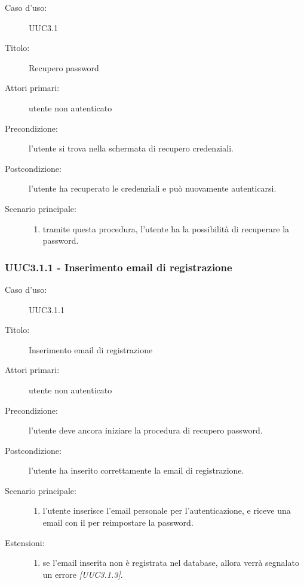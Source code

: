 \documentclass[../../../analisi-dei-requisiti.tex]{subfiles}
\begin{document}
\begin{description}
  \item[Caso d’uso:] UUC3.1
  \item[Titolo:] Recupero password
  \item[Attori primari:] utente non autenticato
  \item[Precondizione:] l'utente si trova nella schermata di recupero credenziali.
  \item[Postcondizione:] l'utente ha recuperato le credenziali e può nuovamente autenticarsi.
  \item[Scenario principale:]
        \begin{enumerate}
          \item tramite questa procedura, l'utente ha la possibilità di recuperare la password.
        \end{enumerate}
\end{description}

\subsubsection{UUC3.1.1 - Inserimento email di registrazione}%
\label{subs:UUC3.1.1}
\begin{description}
  \item[Caso d’uso:] UUC3.1.1
  \item[Titolo:] Inserimento email di registrazione
  \item[Attori primari:] utente non autenticato
  \item[Precondizione:] l'utente deve ancora iniziare la procedura di recupero password.
  \item[Postcondizione:] l'utente ha inserito correttamente la email di registrazione.
  \item[Scenario principale:]
        \begin{enumerate}
          \item l'utente inserisce l'email personale per l'autenticazione, e riceve una email con il  per reimpostare la password.
        \end{enumerate}
  \item[Estensioni:]
        \begin{enumerate}
          \item se l'email inserita non è registrata nel database, allora verrà segnalato un errore \emph{[UUC3.1.3]}.
        \end{enumerate}
\end{description}
\end{document}
